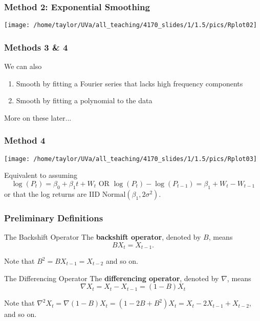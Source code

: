 \documentclass{beamer}
\begin{document}

\begin{frame}
\frametitle{Method 2: Exponential Smoothing}

\begin{center}
\texttt{[image: /home/taylor/UVa/all\_teaching/4170\_slides/1/1.5/pics/Rplot02]}
\end{center}

\end{frame}


\begin{frame}
\frametitle{Methods 3 \& 4}

We can also
\begin{enumerate}
\item Smooth by fitting a Fourier series that lacks high frequency components
\item Smooth by fitting a polynomial to the data
\end{enumerate}
More on these later...
\end{frame}


\begin{frame}
\frametitle{Method 4}
\begin{center}
\texttt{[image: /home/taylor/UVa/all\_teaching/4170\_slides/1/1.5/pics/Rplot03]}
\end{center}
Equivalent to assuming
\[
\log(P_t) = \beta_0 + \beta_1 t + W_t \text{  OR  } \log(P_t) - \log(P_{t-1}) = \beta_1 + W_t - W_{t-1}
\]
or that the log returns are IID $\text{Normal}(\beta_1, 2 \sigma^2)$.
\end{frame}


\begin{frame}
\frametitle{Preliminary Definitions}

\begin{block}{The Backshift Operator}
The {\bf backshift operator}, denoted by $B$, means
\[
B X_t = X_{t-1}. 
\]
\end{block}
Note that $B^2 = BX_{t-1} = X_{t-2}$ and so on.

\begin{block}{The Differencing Operator}
The {\bf differencing operator}, denoted by $\nabla$, means
\[
\nabla X_t = X_t - X_{t-1} = (1-B)X_t
\]
\end{block}
Note that $\nabla^2 X_t = \nabla (1-B)X_t = (1 - 2B + B^2)X_t = X_t - 2 X_{t-1} + X_{t-2}$, and so on.

\end{frame}
\end{document}
